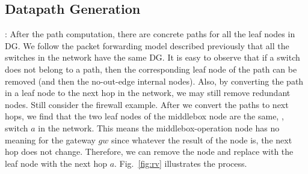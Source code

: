 %
%
%

\vspace{-2mm}
\subsection{Datapath Generation}

: After the path computation, there are concrete paths for all the leaf nodes in DG. We follow the packet forwarding model described previously that all the switches in the network have the same DG. It is easy to observe that if a switch does not belong to a path, then the corresponding leaf node of the path can be removed (and then the no-out-edge internal nodes). Also, by converting the path in a leaf node to the next hop in the network, we may still remove redundant nodes. Still consider the firewall example. After we convert the paths to next hops, we find that the two leaf nodes of the middlebox node are the same, \ie, switch $a$ in the network. This means the middlebox-operation node has no meaning for the gateway $gw$ since whatever the result of the node is, the next hop does not change. Therefore, we can remove the node and replace with the leaf node with the next hop $a$. Fig.~\ref{fig:rv} illustrates the process. 

